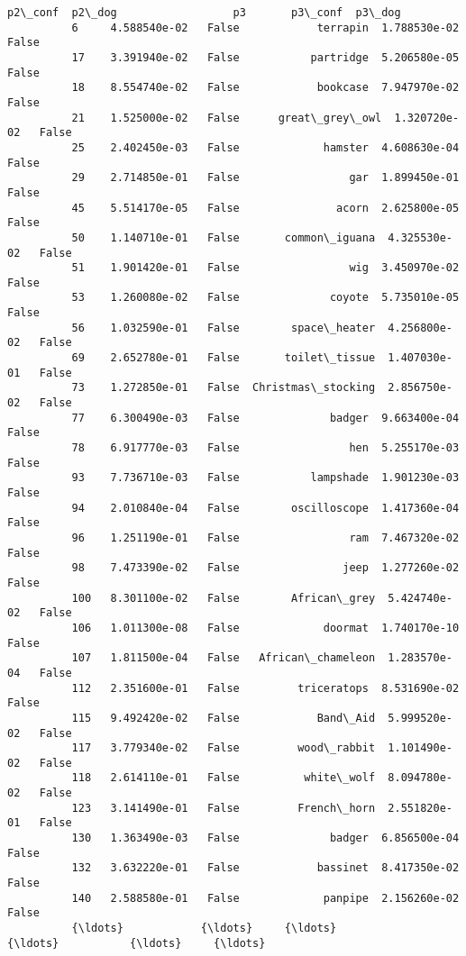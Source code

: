 \documentclass[11pt]{article}
\begin{document}
\begin{Verbatim}[commandchars=\\\{\}]
                     p2\_conf  p2\_dog                  p3       p3\_conf  p3\_dog  
          6     4.588540e-02   False            terrapin  1.788530e-02   False  
          17    3.391940e-02   False           partridge  5.206580e-05   False  
          18    8.554740e-02   False            bookcase  7.947970e-02   False  
          21    1.525000e-02   False      great\_grey\_owl  1.320720e-02   False  
          25    2.402450e-03   False             hamster  4.608630e-04   False  
          29    2.714850e-01   False                 gar  1.899450e-01   False  
          45    5.514170e-05   False               acorn  2.625800e-05   False  
          50    1.140710e-01   False       common\_iguana  4.325530e-02   False  
          51    1.901420e-01   False                 wig  3.450970e-02   False  
          53    1.260080e-02   False              coyote  5.735010e-05   False  
          56    1.032590e-01   False        space\_heater  4.256800e-02   False  
          69    2.652780e-01   False       toilet\_tissue  1.407030e-01   False  
          73    1.272850e-01   False  Christmas\_stocking  2.856750e-02   False  
          77    6.300490e-03   False              badger  9.663400e-04   False  
          78    6.917770e-03   False                 hen  5.255170e-03   False  
          93    7.736710e-03   False           lampshade  1.901230e-03   False  
          94    2.010840e-04   False        oscilloscope  1.417360e-04   False  
          96    1.251190e-01   False                 ram  7.467320e-02   False  
          98    7.473390e-02   False                jeep  1.277260e-02   False  
          100   8.301100e-02   False        African\_grey  5.424740e-02   False  
          106   1.011300e-08   False             doormat  1.740170e-10   False  
          107   1.811500e-04   False   African\_chameleon  1.283570e-04   False  
          112   2.351600e-01   False         triceratops  8.531690e-02   False  
          115   9.492420e-02   False            Band\_Aid  5.999520e-02   False  
          117   3.779340e-02   False         wood\_rabbit  1.101490e-02   False  
          118   2.614110e-01   False          white\_wolf  8.094780e-02   False  
          123   3.141490e-01   False         French\_horn  2.551820e-01   False  
          130   1.363490e-03   False              badger  6.856500e-04   False  
          132   3.632220e-01   False            bassinet  8.417350e-02   False  
          140   2.588580e-01   False             panpipe  2.156260e-02   False  
          {\ldots}            {\ldots}     {\ldots}                 {\ldots}           {\ldots}     {\ldots}  

\end{Verbatim}
\end{document}

